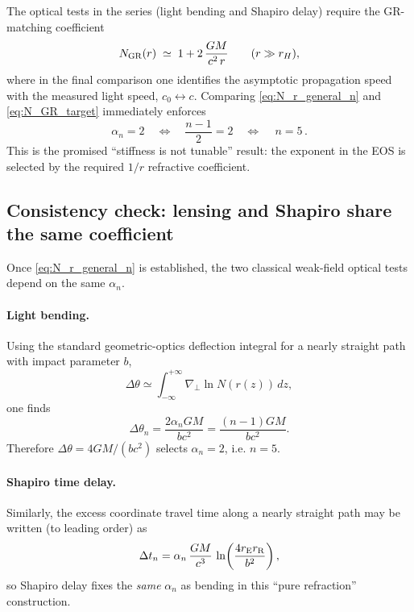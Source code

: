 \documentclass[11pt]{article}
\begin{document}
The optical tests in the series (light bending and Shapiro delay) require the GR-matching coefficient
\begin{equation}
N_{\rm GR}(r)\;\simeq\; 1+2\,\frac{GM}{c^2\,r}
\qquad (r\gg r_H),
\label{eq:N_GR_target}
\end{equation}
where in the final comparison one identifies the asymptotic propagation speed with the measured light speed, $c_0\leftrightarrow c$. Comparing \eqref{eq:N_r_general_n} and \eqref{eq:N_GR_target} immediately enforces
\begin{equation}
\alpha_n = 2
\quad\Longleftrightarrow\quad
\frac{n-1}{2}=2
\quad\Longleftrightarrow\quad
\boxed{\,n=5\,}.
\label{eq:n_equals_5}
\end{equation}
This is the promised ``stiffness is not tunable'' result: the exponent in the EOS is selected by the required $1/r$ refractive coefficient. 

\subsection{Consistency check: lensing and Shapiro share the same coefficient}

Once \eqref{eq:N_r_general_n} is established, the two classical weak-field optical tests depend on the same $\alpha_n$.

\paragraph{Light bending.}
Using the standard geometric-optics deflection integral for a nearly straight path with impact parameter $b$,
\begin{equation}
\Delta\theta \simeq \int_{-\infty}^{+\infty} \nabla_\perp \ln N(r(z))\,dz,
\end{equation}
one finds
\begin{equation}
\Delta\theta_n
=
\frac{2\alpha_n GM}{b c^2}
=
\frac{(n-1)GM}{b c^2}.
\label{eq:deflection_general_n}
\end{equation}
Therefore $\Delta\theta=4GM/(bc^2)$ selects $\alpha_n=2$, i.e. $n=5$.

\paragraph{Shapiro time delay.}
Similarly, the excess coordinate travel time along a nearly straight path may be written (to leading order) as
\begin{equation}
\Delta t_n
=
\alpha_n\,\frac{GM}{c^3}\,
\ln\!\left(\frac{4r_{\rm E}r_{\rm R}}{b^2}\right),
\label{eq:shapiro_general_n}
\end{equation}
so Shapiro delay fixes the \emph{same} $\alpha_n$ as bending in this ``pure refraction'' construction.
\end{document}
